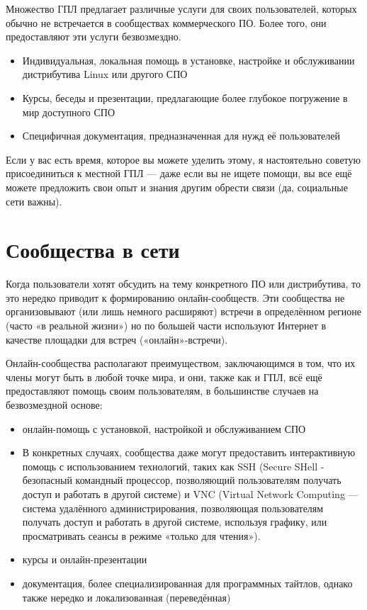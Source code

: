 \documentclass[10pt]{book}
\begin{document}
Множество ГПЛ предлагает различные услуги для своих пользователей, которых обычно не встречается в сообществах коммерческого ПО. Более того, они предоставляют эти услуги безвозмездно.

\begin{itemize}
	\item Индивидуальная, локальная помощь в установке, настройке и обслуживании дистрибутива Linux или другого СПО
	\item Курсы, беседы и презентации, предлагающие более глубокое погружение в мир доступного СПО
	\item Специфичная документация, предназначенная для нужд её пользователей
\end{itemize}

Если у вас есть время, которое вы можете уделить этому, я настоятельно советую присоединиться к местной ГПЛ — даже если вы не ищете помощи, вы все ещё можете предложить свои опыт и знания другим  обрести связи (да, социальные сети важны).

\section{Сообщества в сети}

Когда пользователи хотят обсудить на тему конкретного ПО или дистрибутива, то это нередко приводит к формированию онлайн-сообществ. Эти сообщества не организовывают (или лишь немного расширяют) встречи в определённом регионе (часто «в реальной жизни») но по большей части используют Интернет в качестве площадки для встреч («онлайн»-встречи).

Онлайн-сообщества располагают преимуществом, заключающимся в том, что их члены могут быть в любой точке мира, и они, также как и ГПЛ, всё ещё предоставляют помощь своим пользователям, в большинстве случаев на безвозмездной основе:

\begin{itemize}
	\item онлайн-помощь с установкой, настройкой и обслуживанием СПО
	\item В конкретных случаях, сообщества даже могут предоставить интерактивную помощь с использованием технологий, таких как SSH (Secure SHell - безопасный командный процессор, позволяющий пользователям получать доступ и работать в другой системе) и VNC (Virtual Network Computing — система удалённого администрирования,  позволяющая пользователям получать доступ и работать в другой системе, используя графику, или просматривать сеансы в режиме «только для чтения»).
	\item курсы и онлайн-презентации
	\item документация, более специализированная для программных тайтлов, однако также нередко и локализованная (переведённая)
\end{itemize}
\end{document}
